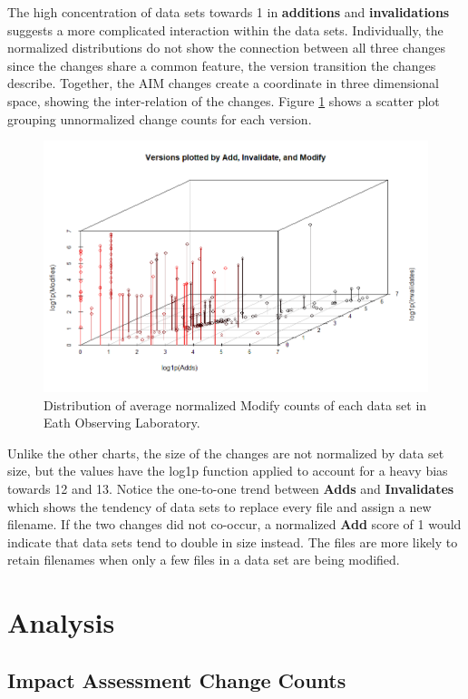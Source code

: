 The high concentration of data sets towards 1 in \textbf{additions} and \textbf{invalidations} suggests a more complicated interaction within the data sets.
Individually, the normalized distributions do not show the connection between all three changes since the changes share a common feature, the version transition the changes describe.
Together, the AIM changes create a coordinate in three dimensional space, showing the inter-relation of the changes. 
Figure \ref{EOL_AIM} shows a scatter plot grouping unnormalized change counts for each version.
\begin{figure}%
	\centering
	\includegraphics[scale=.6]{figures/Eol_Versions_3d.png}
	\caption{Distribution of average normalized Modify counts of each data set in Eath Observing Laboratory.}
	\label{EOL_AIM}
\end{figure}
Unlike the other charts, the size of the changes are not normalized by data set size, but the values have the log1p function applied to account for a heavy bias towards 12 and 13.
Notice the one-to-one trend between \textbf{Adds} and \textbf{Invalidates} which shows the tendency of data sets to replace every file and assign a new filename.
If the two changes did not co-occur, a normalized \textbf{Add} score of 1 would indicate that data sets tend to double in size instead.
The files are more likely to retain filenames when only a few files in a data set are being modified.

\section{Analysis}

\subsection{Impact Assessment Change Counts}

